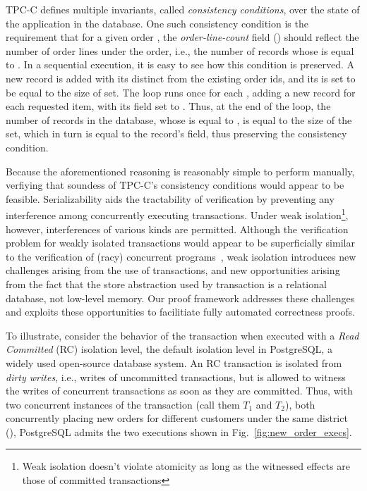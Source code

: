 TPC-C defines multiple invariants, called \emph{consistency
  conditions}, over the state of the application in the database. One
such consistency condition is the requirement that for a given order
, the \emph{order-line-count} field () should
reflect the number of order lines under the order, i.e., the number of
 records whose  is equal to .
In a sequential execution, it is easy to see how this condition is
preserved.  A new  record is added with its 
distinct from the existing order ids, and its  is set to
be equal to the size of  set. The  loop runs
once for each , adding a new  record for
each requested item, with its  field set to
. Thus, at the end of the loop, the number of 
records in the database, whose  is equal to , is
equal to the size of the  set, which in turn is equal to
the  record's  field, thus preserving the
consistency condition.

Because the aforementioned reasoning is reasonably simple to perform
manually, verfiying that soundess of TPC-C's consistency conditions
would appear to be feasible.  Serializability aids the tractability of
verification by preventing any interference among concurrently
executing transactions.  Under weak isolation\footnote{Weak isolation
  doesn't violate atomicity as long as the witnessed effects are those
  of committed transactions}, however, interferences of various kinds
are permitted.  Although the verification problem for weakly isolated
transactions would appear to be superficially similar to the
verification of (racy) concurrent programs~\cite{concurrentGC...},
weak isolation introduces new challenges arising from the use of
transactions, and new opportunities arising from the fact that the
store abstraction used by transaction is a relational database, not
low-level memory.  Our proof framework addresses these challenges and
exploits these opportunities to facilitiate fully automated
correctness proofs.

To illustrate, consider the behavior of the  transaction
when executed with a \emph{Read Committed} (RC) isolation level, the
default isolation level in PostgreSQL, a widely used open-source
database system.  An RC transaction is isolated from \emph{dirty
  writes}, i.e., writes of uncommitted transactions, but is allowed to
witness the writes of concurrent transactions as soon as they are
committed. Thus, with two concurrent instances of the 
transaction (call them $T_1$ and $T_2$), both concurrently placing new
orders for different customers under the same district (),
PostgreSQL admits the two executions shown in
Fig.~\ref{fig:new_order_execs}.

